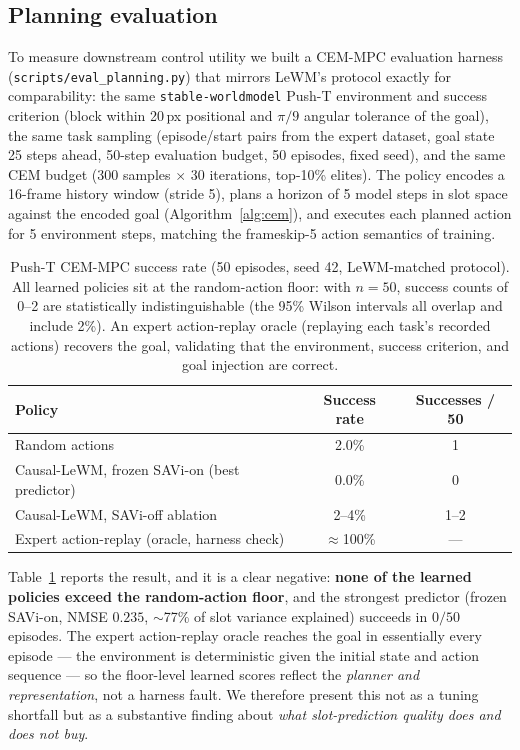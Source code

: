 \documentclass[12pt]{article}
\begin{document}
\subsection{Planning evaluation}
\label{sec:planning}

To measure downstream control utility we built a CEM-MPC evaluation harness (\texttt{scripts/eval\_planning.py}) that mirrors LeWM's protocol exactly for comparability: the same \texttt{stable-worldmodel} Push-T environment and success criterion (block within 20\,px positional and $\pi/9$ angular tolerance of the goal), the same task sampling (episode/start pairs from the expert dataset, goal state 25 steps ahead, 50-step evaluation budget, 50 episodes, fixed seed), and the same CEM budget (300 samples $\times$ 30 iterations, top-10\% elites). The policy encodes a 16-frame history window (stride 5), plans a horizon of 5 model steps in slot space against the encoded goal (Algorithm~\ref{alg:cem}), and executes each planned action for 5 environment steps, matching the frameskip-5 action semantics of training.

\begin{table}[t]
\centering
\caption{Push-T CEM-MPC success rate (50 episodes, seed 42, LeWM-matched protocol). All learned policies sit at the random-action floor: with $n{=}50$, success counts of 0--2 are statistically indistinguishable (the 95\% Wilson intervals all overlap and include 2\%). An expert action-replay oracle (replaying each task's recorded actions) recovers the goal, validating that the environment, success criterion, and goal injection are correct.}
\small
\begin{tabular}{@{}lcc@{}}
\toprule
\textbf{Policy} & \textbf{Success rate} & \textbf{Successes / 50} \\
\midrule
Random actions & 2.0\% & 1 \\
Causal-LeWM, frozen SAVi-on (best predictor) & 0.0\% & 0 \\
Causal-LeWM, SAVi-off ablation & 2--4\% & 1--2 \\
\midrule
Expert action-replay (oracle, harness check) & $\approx$100\% & --- \\
\bottomrule
\end{tabular}
\label{tab:planning}
\end{table}

Table~\ref{tab:planning} reports the result, and it is a clear negative: \textbf{none of the learned policies exceed the random-action floor}, and the strongest predictor (frozen SAVi-on, NMSE $0.235$, $\sim$77\% of slot variance explained) succeeds in $0/50$ episodes. The expert action-replay oracle reaches the goal in essentially every episode --- the environment is deterministic given the initial state and action sequence --- so the floor-level learned scores reflect the \emph{planner and representation}, not a harness fault. We therefore present this not as a tuning shortfall but as a substantive finding about \emph{what slot-prediction quality does and does not buy}.
\end{document}
